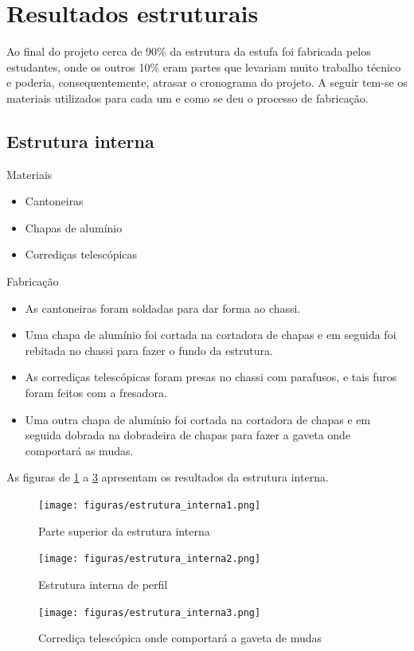\section{Resultados estruturais}

Ao final do projeto cerca de 90\% da estrutura da estufa foi fabricada pelos estudantes, onde os outros 10\% eram partes que levariam muito trabalho técnico e poderia, consequentemente, atrasar o cronograma do projeto. A seguir tem-se os materiais utilizados para cada um e como se deu o processo de fabricação.
\subsection{Estrutura interna}
Materiais
\begin{itemize}
	\item Cantoneiras
	\item Chapas de alumínio
	\item Corrediças telescópicas
\end{itemize}
Fabricação
\begin{itemize}
	\item As cantoneiras foram soldadas para dar forma ao chassi.
	\item Uma chapa de alumínio foi cortada na cortadora de chapas e em seguida foi rebitada no chassi para fazer o fundo da estrutura.
	\item As corrediças telescópicas foram presas no chassi com parafusos, e tais furos foram feitos com a fresadora.
	\item Uma outra chapa de alumínio foi cortada na cortadora de chapas e em seguida dobrada na dobradeira de chapas para fazer a gaveta onde comportará as mudas.
	
\end{itemize}

As figuras de \ref{fig:estrutura_interna1} a \ref{fig:estrutura_interna3} apresentam os resultados da estrutura interna.
\begin{figure}[!htb]
	\centering
	\texttt{[image: figuras/estrutura\_interna1.png]}
	\caption{Parte superior da estrutura interna}
	\label{fig:estrutura_interna1}
\end{figure}
\begin{figure}[!htb]
	\centering
	\texttt{[image: figuras/estrutura\_interna2.png]}
	\caption{Estrutura interna de perfil}
	\label{fig:estrutura_interna2}
\end{figure}
\begin{figure}[!htb]
	\centering
	\texttt{[image: figuras/estrutura\_interna3.png]}
	\caption{Corrediça telescópica onde comportará a gaveta de mudas}
	\label{fig:estrutura_interna3}
\end{figure}
